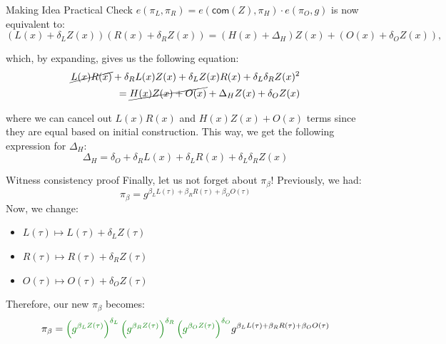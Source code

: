 \documentclass{zkdl-presentation-template}
\begin{document}
    \begin{frame}{Making Idea Practical}
        Check $e(\pi_L, \pi_R) = e(\mathsf{com}(Z), \pi_H) \cdot e(\pi_O, g)$ is now equivalent to:
        \begin{equation*}
            (L(x) + \delta_L Z(x))(R(x) + \delta_R Z(x)) = (H(x) + \Delta_H)Z(x) + (O(x) + \delta_O Z(x)),
        \end{equation*}
        
         which, by expanding, gives us the following equation:
        \begin{align*}
            \cancel{L(x)R(x)} + \delta_R L(x)Z(x) + \delta_L Z(x)R(x) + \delta_L \delta_R Z(x)^2 \\= \cancel{H(x)Z(x) + O(x)} + \Delta_HZ(x) + \delta_O Z(x)
        \end{align*}
        
         where we can cancel out $L(x)R(x)$ and $H(x)Z(x) + O(x)$ terms since they are equal based on initial construction. This way, we get the following expression for $\Delta_H$:
        \begin{equation*}
            \boxed{\Delta_H = \delta_O + \delta_R L(x) + \delta_L R(x) + \delta_L \delta_R Z(x)}
        \end{equation*}
    \end{frame}

    \begin{frame}{Witness consistency proof}
        Finally, let us not forget about $\pi_{\beta}$! Previously, we had:
        \begin{equation*}
            \pi_{\beta} = g^{\beta_LL(\tau) + \beta_RR(\tau) + \beta_OO(\tau)}
        \end{equation*}
         Now, we change: 
        \begin{itemize}[label=]
            \item $L(\tau) \mapsto L(\tau) + \delta_L Z(\tau)$
            \item $R(\tau) \mapsto R(\tau) + \delta_R Z(\tau)$
            \item $O(\tau) \mapsto O(\tau) + \delta_O Z(\tau)$
        \end{itemize}
        
         Therefore, our new $\pi_{\beta}$ becomes:
        \begin{equation*}
            \pi_{\beta} = \textcolor{green!50!black}{\left(g^{\beta_LZ(\tau)}\right)^{\delta_L}\left(g^{\beta_R Z(\tau)}\right)^{\delta_R}\left(g^{\beta_O Z(\tau)}\right)^{\delta_O}}g^{\beta_L L(\tau) + \beta_R R(\tau) + \beta_O O(\tau)}
        \end{equation*}
    \end{frame}
\end{document}
